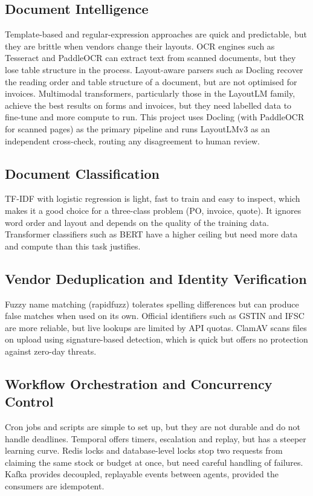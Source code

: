 \subsection{Document Intelligence}
Template-based and regular-expression approaches are quick and predictable, but they are brittle when vendors change their layouts. OCR engines such as Tesseract and PaddleOCR can extract text from scanned documents, but they lose table structure in the process. Layout-aware parsers such as Docling recover the reading order and table structure of a document, but are not optimised for invoices. Multimodal transformers, particularly those in the LayoutLM family, achieve the best results on forms and invoices, but they need labelled data to fine-tune and more compute to run. This project uses Docling (with PaddleOCR for scanned pages) as the primary pipeline and runs LayoutLMv3 as an independent cross-check, routing any disagreement to human review.

\subsection{Document Classification}
TF-IDF with logistic regression is light, fast to train and easy to inspect, which makes it a good choice for a three-class problem (PO, invoice, quote). It ignores word order and layout and depends on the quality of the training data. Transformer classifiers such as BERT have a higher ceiling but need more data and compute than this task justifies.

\subsection{Vendor Deduplication and Identity Verification}
Fuzzy name matching (rapidfuzz) tolerates spelling differences but can produce false matches when used on its own. Official identifiers such as GSTIN and IFSC are more reliable, but live lookups are limited by API quotas. ClamAV scans files on upload using signature-based detection, which is quick but offers no protection against zero-day threats.

\subsection{Workflow Orchestration and Concurrency Control}
Cron jobs and scripts are simple to set up, but they are not durable and do not handle deadlines. Temporal offers timers, escalation and replay, but has a steeper learning curve. Redis locks and database-level locks stop two requests from claiming the same stock or budget at once, but need careful handling of failures. Kafka provides decoupled, replayable events between agents, provided the consumers are idempotent.

